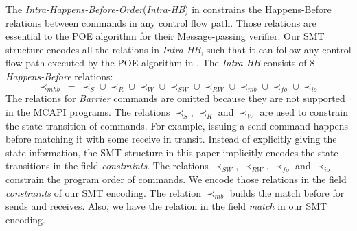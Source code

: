 The \textit{Intra-Happens-Before-Order}(\textit{Intra-HB}) in \cite{sarvani:fm09} constrains the Happens-Before relations between commands in any control flow path. Those relations are essential to the POE algorithm for their Message-passing verifier. Our SMT structure encodes all the relations in \textit{Intra-HB}, such that it can follow any control flow path executed by the POE algorithm in \cite{sarvani:fm09}. The \textit{Intra-HB} consists of 8 \textit{Happens-Before} relations:
\[\prec_{mhb}\ =\ \prec_S \cup \prec_R \cup \prec_W \cup \prec_{SW} \cup \prec_{RW} \cup \prec_{mb} \cup \prec_{fo} \cup \prec_{io} \]
The relations for \textit{Barrier} commands are omitted because they are not supported in the MCAPI programs. The relations $\prec_S$, $\prec_R$ and $\prec_W$ are used to constrain the state transition of commands. For example, issuing a send command happens before matching it with some receive in transit. Instead of explicitly giving the state information, the SMT structure in this paper implicitly encodes the state transitions in the field \textit{constraints}. The relations $\prec_{SW}$, $\prec_{RW}$, $\prec_{fo}$ and $\prec_{io}$ constrain the program order of commands. We encode those relations in the field \textit{constraints} of our SMT encoding. The relation $\prec_{mb}$ builds the match before for sends and receives. Also, we have the relation in the field \textit{match} in our SMT encoding.

